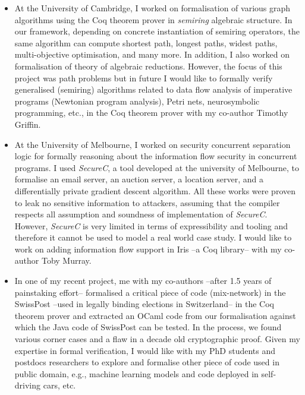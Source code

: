 \documentclass[a4paper]{article}
\begin{document}
\begin{itemize}
	\item At the University of Cambridge, I worked on formalisation of 
	various graph algorithms using the Coq theorem prover in \emph{semiring} 
	algebraic structure. In our framework, depending on concrete 
	instantiation of semiring operators,
	the same algorithm can compute shortest path, longest paths, widest paths, 
	multi-objective optimisation, and many more. In addition, 
	I also worked on formalisation of theory of algebraic reductions. 
	However, the focus of this project 
	was path problems but in future I would like to formally verify 
	generalised (semiring) algorithms related to 
	data flow analysis of imperative programs (Newtonian program analysis), Petri nets, 
	neurosymbolic programming, etc., in the Coq theorem prover with 
	my co-author Timothy Griffin.



\item At the University of Melbourne, I worked on 
security concurrent separation logic for formally reasoning about the information 
flow security in concurrent programs. I used \textit{SecureC}, a tool developed at the university of 
Melbourne, to formalise an email server, an auction server, a location server, and 
a differentially private gradient descent algorithm. 
All these works were proven to leak no sensitive 
information to attackers, assuming that the compiler respects all 
assumption and soundness of implementation of \textit{SecureC}. However, 
\textit{SecureC} is very limited in terms of expressibility and tooling 
and therefore it cannot be used to model a real world case study. I would like to work on 
adding information flow support in Iris --a Coq library-- with my co-author Toby Murray. 


\item In one of my recent project, me with my co-authors --after 1.5 years of 
painstaking effort-- formalised a critical 
piece of code (mix-network) in the SwissPost --used in legally binding elections 
in Switzerland-- in the Coq theorem prover and extracted an OCaml code from our 
formalisation against which the Java code of SwissPost can be tested. 
In the process, we found various 
corner cases and a flaw in a decade old cryptographic proof.  Given my 
expertise in formal verification, I would like with my PhD students and 
postdocs researchers to explore and formalise other 
piece of code used in public domain, e.g., machine learning 
models and code deployed in self-driving cars, etc. 


\end{itemize}	
\end{document}

